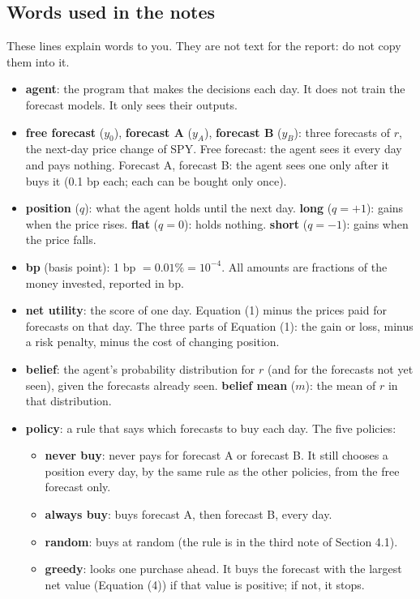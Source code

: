 \documentclass{article}
\newenvironment{pts}{\begin{itemize}[nosep,leftmargin=1.15em,topsep=1pt]}{\end{itemize}}
\begin{document}
\subsection*{Words used in the notes}
These lines explain words to you. They are not text for the report: do not copy them into it.
\begin{pts}
\item \textbf{agent}: the program that makes the decisions each day. It does not train the forecast models. It only sees their outputs.
\item \textbf{free forecast} ($y_0$), \textbf{forecast A} ($y_A$), \textbf{forecast B} ($y_B$): three forecasts of $r$, the next-day price change of SPY. Free forecast: the agent sees it every day and pays nothing. Forecast A, forecast B: the agent sees one only after it buys it (0.1 bp each; each can be bought only once).
\item \textbf{position} ($q$): what the agent holds until the next day. \textbf{long} ($q=+1$): gains when the price rises. \textbf{flat} ($q=0$): holds nothing. \textbf{short} ($q=-1$): gains when the price falls.
\item \textbf{bp} (basis point): 1 bp $= 0.01\% = 10^{-4}$. All amounts are fractions of the money invested, reported in bp.
\item \textbf{net utility}: the score of one day. Equation (1) minus the prices paid for forecasts on that day. The three parts of Equation (1): the gain or loss, minus a risk penalty, minus the cost of changing position.
\item \textbf{belief}: the agent's probability distribution for $r$ (and for the forecasts not yet seen), given the forecasts already seen. \textbf{belief mean} ($m$): the mean of $r$ in that distribution.
\item \textbf{policy}: a rule that says which forecasts to buy each day. The five policies:
  \begin{itemize}[nosep,leftmargin=1.15em,topsep=0pt]
  \item \textbf{never buy}: never pays for forecast A or forecast B. It still chooses a position every day, by the same rule as the other policies, from the free forecast only.
  \item \textbf{always buy}: buys forecast A, then forecast B, every day.
  \item \textbf{random}: buys at random (the rule is in the third note of Section 4.1).
  \item \textbf{greedy}: looks one purchase ahead. It buys the forecast with the largest net value (Equation (4)) if that value is positive; if not, it stops.

\end{itemize}
\end{pts}
\end{document}
